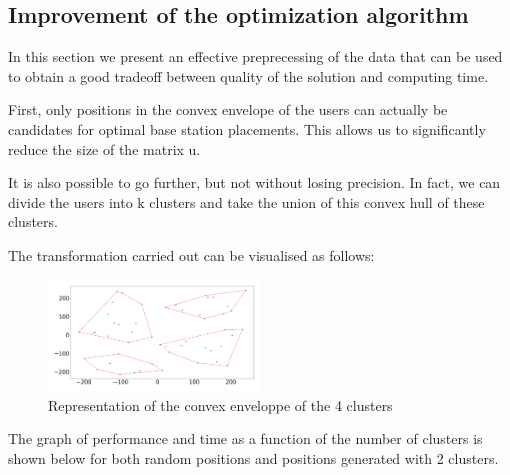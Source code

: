 \documentclass[letterpaper]{article}
\begin{document}
\subsection{Improvement of the optimization algorithm}

In this section we present an effective preprecessing of the data that can be used to obtain a good
tradeoff between quality of the solution and computing time.

First, only positions in the convex envelope of the users can actually be candidates for optimal base station placements.
This allows us to significantly reduce the size of the matrix u.

It is also possible to go further, but not without losing precision.
In fact, we can divide the users into k clusters and take the union of this convex hull of these clusters.

The transformation carried out can be visualised as follows:

\begin{figure}[H]
    \centering
    \includegraphics[width=0.5\textwidth]{images/four_cluster.png}
    \caption{Representation of the convex enveloppe of the 4 clusters}
\end{figure}

The graph of performance and time as a function of the number of clusters is shown below for both random positions and positions generated with 2 clusters.
\end{document}
